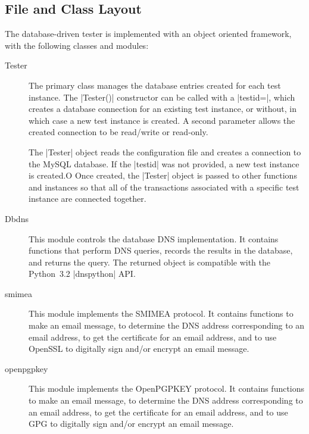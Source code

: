 \documentclass[preprint,3p,11pt]{elsarticle}
\begin{document}
\subsection{File and Class Layout}
The database-driven tester is implemented with an object oriented
framework, with the following classes and modules:

\begin{description}
\item[Tester] The primary class manages the database entries
created for each test instance. The |Tester()| constructor can be
called with a |testid=|, which creates a database connection for an
existing test instance, or without, in which case a new test instance
is created. A second parameter allows the created connection to be
read/write or read-only.

The |Tester| object reads the configuration file and creates a
connection to the MySQL database. If the |testid| was not provided, a
new test instance is created.O Once created, the |Tester| object is
passed to other functions and instances so that all of the
transactions associated with a specific test instance are connected
together.

\item[Dbdns] This module controls the database DNS
implementation. It contains functions that perform DNS queries,
records the results in the database, and returns the query. The
returned object  is compatible with the Python~3.2 |dnspython| API.

\item[smimea] This module implements the SMIMEA protocol. It contains
  functions to make an email message, to determine the DNS address
  corresponding to an email address, to get the certificate for an
  email address, and to use OpenSSL to digitally sign and/or encrypt
  an email message.

\item[openpgpkey] This module implements the OpenPGPKEY protocol. It contains
  functions to make an email message, to determine the DNS address
  corresponding to an email address, to get the certificate for an
  email address, and to use GPG to digitally sign and/or encrypt
  an email message.

\end{description}
\end{document}
